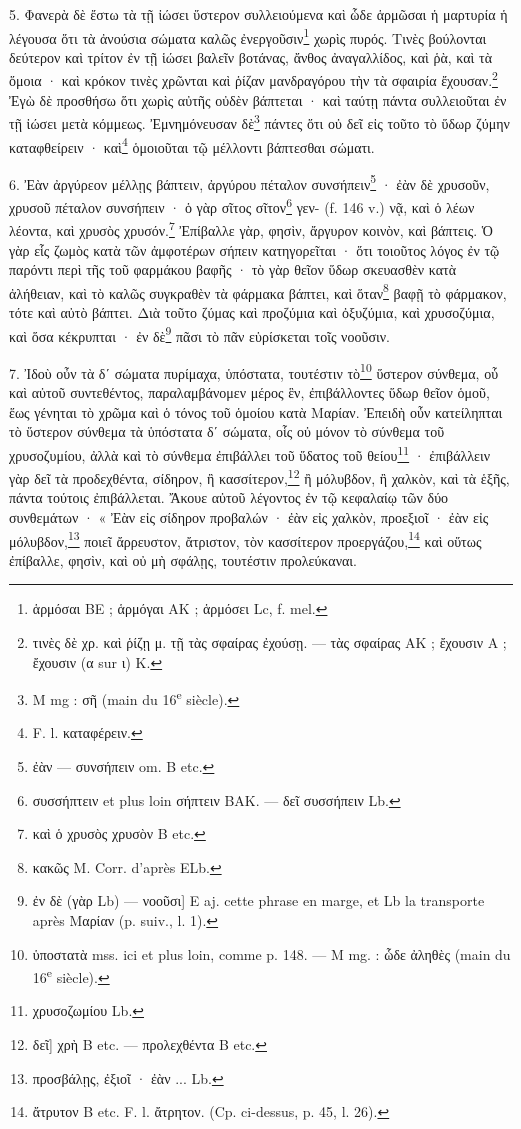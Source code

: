 \documentclass[landscape, a4paper, 11pt, oneside, polutonikogreek, french]{article}
\begin{document}
5. Φανερὰ δὲ ἔστω τὰ τῇ ἰώσει ὕστερον συλλειούμενα καὶ ὧδε ἁρμῶσαι ἡ μαρτυρία ἡ λέγουσα ὅτι τὰ ἀνούσια σώματα καλῶς ἐνεργοῦσιν\footnote{ἁρμόσαι BE ; ἁρμόγαι AK ; ἁρμόσει Lc, f. mel.} χωρὶς πυρός. Τινὲς βούλονται δεύτερον καὶ τρίτον ἐν τῇ ἱώσει βαλεῖν βοτάνας, ἄνθος ἀναγαλλίδος, καὶ ῥὰ, καὶ τὰ ὅμοια · καὶ κρόκον τινὲς χρῶνται καὶ ῥίζαν μανδραγόρου τὴν τὰ σφαιρία ἔχουσαν.\footnote{τινὲς δὲ χρ. καὶ ῥίζῃ μ. τῇ τὰς σφαίρας ἐχούσῃ. --- τὰς σφαίρας AK ; ἔχουσιν A ; ἔχουσιν (α sur ι) K.} Ἐγὼ δὲ προσθήσω ὅτι χωρὶς αὐτῆς οὐδὲν βάπτεται · καὶ ταύτῃ πάντα συλλειοῦται ἐν τῇ ἰώσει μετὰ κόμμεως. Ἐμνημόνευσαν δὲ\footnote{M mg : σῆ (main du 16\textsuperscript{e} siècle).} πάντες ὅτι οὐ δεῖ εἰς τοῦτο τὸ ὕδωρ ζύμην καταφθείρειν · καὶ\footnote{F. l. καταφέρειν.} ὁμοιοῦται τῷ μέλλοντι βάπτεσθαι σώματι.

6. Ἐὰν ἀργύρεον μέλλῃς βάπτειν, ἀργύρου πέταλον συνσήπειν\footnote{ἐὰν --- συνσήπειν om. B etc.} · ἐὰν δὲ χρυσοῦν, χρυσοῦ πέταλον συνσήπειν · ὁ γὰρ σῖτος σῖτον\footnote{συσσήπτειν et plus loin σήπτειν BAK. --- δεῖ συσσήπειν Lb.} γεν- (f. 146 v.) νᾷ, καὶ ὁ λέων λέοντα, καὶ χρυσὸς χρυσόν.\footnote{καὶ ὁ χρυσὸς χρυσὸν B etc.} Ἐπίβαλλε γὰρ, φησὶν, ἄργυρον κοινὸν, καὶ βάπτεις. Ὁ γὰρ εἷς ζωμὸς κατὰ τῶν ἀμφοτέρων σήπειν κατηγορεῖται · ὅτι τοιοῦτος λόγος ἐν τῷ παρόντι περὶ τῆς τοῦ φαρμάκου βαφῆς · τὸ γὰρ θεῖον ὕδωρ σκευασθὲν κατὰ ἀλήθειαν, καὶ τὸ καλῶς συγκραθὲν τὰ φάρμακα βάπτει, καὶ ὅταν\footnote{κακῶς M. Corr. d'après ELb.} βαφῇ τὸ φάρμακον, τότε καὶ αὐτὸ βάπτει. Διὰ τοῦτο ζύμας καὶ προζύμια καὶ ὀξυζύμια, καὶ χρυσοζύμια, καὶ ὅσα κέκρυπται · ἐν δὲ\footnote{ἐν δὲ (γὰρ Lb) --- νοοῦσι] E aj. cette phrase en marge, et Lb la transporte après Mαρίαν (p. suiv., l. 1).} πᾶσι τὸ πᾶν εὑρίσκεται τοῖς νοοῦσιν.

7. Ἰδοὺ οὖν τὰ δʹ σώματα πυρίμαχα, ὑπόστατα, τουτέστιν τὸ\footnote{ὑποστατὰ mss. ici et plus loin, comme p. 148. --- M mg. : ὧδε ἀληθὲς (main du 16\textsuperscript{e} siècle).} ὕστερον σύνθεμα, οὗ καὶ αὐτοῦ συντεθέντος, παραλαμβάνομεν μέρος ἓν, ἐπιβάλλοντες ὕδωρ θεῖον ὁμοῦ, ἕως γένηται τὸ χρῶμα καὶ ὁ τόνος τοῦ ὁμοίου κατὰ Μαρίαν. Ἐπειδὴ οὖν κατείληπται τὸ ὕστερον σύνθεμα τὰ ὑπόστατα δʹ σώματα, οἷς οὐ μόνον τὸ σύνθεμα τοῦ χρυσοζυμίου, ἀλλὰ καὶ τὸ σύνθεμα ἐπιβάλλει τοῦ ὕδατος τοῦ θείου\footnote{χρυσοζωμίου Lb.} · ἐπιβάλλειν γὰρ δεῖ τὰ προδεχθέντα, σίδηρον, ἢ κασσίτερον,\footnote{δεῖ] χρὴ B etc. --- προλεχθέντα B etc.} ἢ μόλυβδον, ἢ χαλκὸν, καὶ τὰ ἑξῆς, πάντα τούτοις ἐπιβάλλεται. Ἄκουε αὐτοῦ λέγοντος ἐν τῷ κεφαλαίῳ τῶν δύο συνθεμάτων · « Ἐὰν εἰς σίδηρον προβαλών · ἐὰν εἰς χαλκὸν, προεξιοῖ · ἐὰν εἰς μόλυβδον,\footnote{προσβάλῃς, ἐξιοῖ · ἐὰν ... Lb.} ποιεῖ ἄρρευστον, ἄτριστον, τὸν κασσίτερον προεργάζου,\footnote{ἄτρυτον B etc. F. l. ἄτρητον. (Cp. ci-dessus, p. 45, l. 26).} καὶ οὕτως ἐπίβαλλε, φησὶν, καὶ οὐ μὴ σφάλῃς, τουτέστιν προλεύκαναι.
\end{document}
